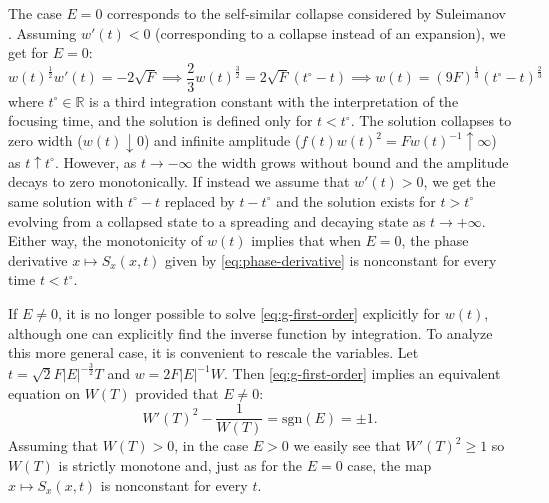 \documentclass[12pt]{amsart}
\numberwithin{equation}{section}
\def\eq{\begin{equation}}
\def\endeq{\end{equation}}
\begin{document}
The case $E=0$  corresponds to the self-similar collapse considered by Suleimanov \cite{Suleimanov17}.  Assuming $w'(t)<0$ (corresponding to a collapse instead of an expansion), we get for $E=0$:
\eq
w(t)^{\frac{1}{2}}w'(t)=-2\sqrt{F}\implies \frac{2}{3}w(t)^{\frac{3}{2}}=2\sqrt{F}(t^\circ-t)\implies w(t)=(9F)^{\frac{1}{3}}(t^\circ-t)^{\frac{2}{3}}
\endeq
where $t^\circ\in\mathbb{R}$ is a third integration constant with the interpretation of the focusing time, and the solution is defined only for $t<t^\circ$.  
The solution collapses to zero width ($w(t)\downarrow 0$) and infinite 
amplitude ($f(t)w(t)^2=Fw(t)^{-1}\uparrow \infty$) as $t\uparrow t^\circ$.  
However, as $t\to -\infty$ the width grows without bound and the amplitude 
decays to zero monotonically.  
If instead we assume that $w'(t)>0$, we get the same solution with $t^\circ-t$ replaced by $t-t^\circ$ and the solution exists for $t>t^\circ$ evolving from a collapsed state to a spreading and decaying state as $t\to +\infty$.  Either way, the monotonicity of $w(t)$ implies that when $E=0$, the phase derivative $x\mapsto S_x(x,t)$ given by \eqref{eq:phase-derivative} is nonconstant for every time $t<t^\circ$.  

If $E\neq 0$, it is no longer possible to solve \eqref{eq:g-first-order} explicitly for $w(t)$, although one can explicitly find the inverse function by integration.  To analyze this more general case, it is convenient to rescale the variables.  Let $t=\sqrt{2}F |E|^{-\frac{3}{2}}T$ and $w=2F|E|^{-1}W$.  Then \eqref{eq:g-first-order} implies an equivalent equation on $W(T)$ provided that $E\neq 0$:
\eq
W'(T)^2-\frac{1}{W(T)}=\mathrm{sgn}(E)=\pm 1.
\label{eq:G-first-order}
\endeq
Assuming that $W(T)>0$, in the case $E>0$ we easily see that $W'(T)^2\ge 1$ so $W(T)$ is strictly monotone and, just as for the $E=0$ case, the map $x\mapsto S_x(x,t)$ is nonconstant for every $t$.  
\end{document}
